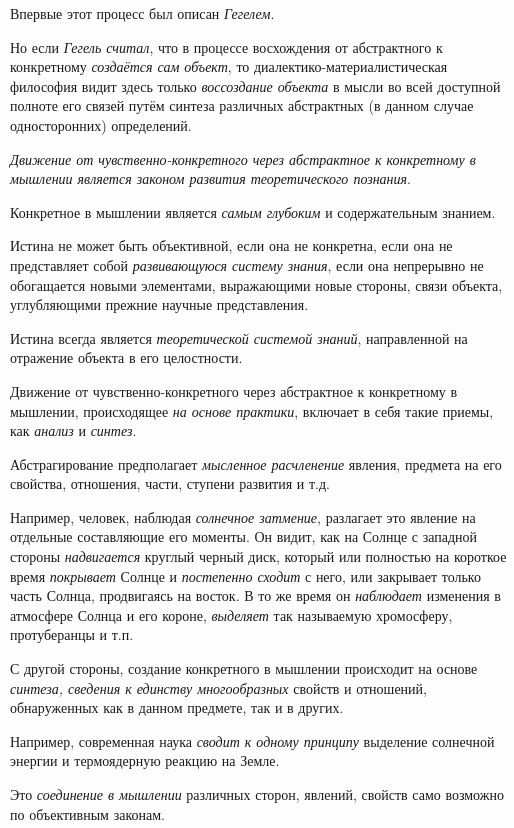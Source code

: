 \documentclass[a4paper,14pt,russian]{extreport}
\begin{document}
Впервые этот процесс был описан \emph{Гегелем}.

Но если \emph{Гегель считал}, что в процессе восхождения от абстрактного к конкретному \emph{создаётся сам объект}, то диалектико-материалистическая философия видит здесь только \emph{воссоздание объекта} в мысли во всей доступной полноте его связей путём синтеза различных абстрактных (в данном случае односторонних) определений.

\emph{Движение от чувственно-конкретного через абстрактное к конкретному в мышлении является законом развития теоретического познания}.

Конкретное в мышлении является \emph{самым глубоким} и содержательным знанием.

Истина не может быть объективной, если она не конкретна, если она не представляет собой \emph{развивающуюся систему знания}, если она непрерывно не обогащается новыми элементами, выражающими новые стороны, связи объекта, углубляющими прежние научные представления.

Истина всегда является \emph{теоретической системой знаний}, направленной на отражение объекта в его целостности.

Движение от чувственно-конкретного через абстрактное к конкретному в мышлении, происходящее \emph{на основе практики}, включает в себя такие приемы, как \emph{анализ} и \emph{синтез}.

Абстрагирование предполагает \emph{мысленное расчленение} явления, предмета на его свойства, отношения, части, ступени развития и т.д.

Например, человек, наблюдая \emph{солнечное затмение}, разлагает это явление на отдельные составляющие его моменты. Он видит, как на Солнце с западной стороны \emph{надвигается} круглый черный диск, который или полностью на короткое время \emph{покрывает} Солнце и \emph{постепенно сходит} с него, или закрывает только часть Солнца, продвигаясь на восток. В то же время он \emph{наблюдает} изменения в атмосфере Солнца и его короне, \emph{выделяет} так называемую хромосферу, протуберанцы и т.п.

С другой стороны, создание конкретного в мышлении происходит на основе \emph{синтеза, сведения к единству многообразных} свойств и отношений, обнаруженных как в данном предмете, так и в других.

Например, современная наука \emph{сводит к одному принципу} выделение солнечной энергии и термоядерную реакцию на Земле.

Это \emph{соединение в мышлении} различных сторон, явлений, свойств само возможно по объективным законам.
\end{document}
